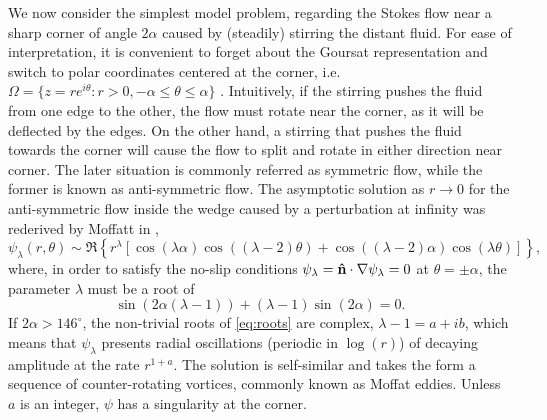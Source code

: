 We now consider the simplest model problem, regarding the Stokes flow near a sharp corner of angle $2\alpha$ caused by (steadily) stirring the distant fluid. For ease of interpretation, it is convenient to forget about the Goursat representation and switch to polar coordinates centered at the corner, i.e. $\Omega = \{z = re^{i\theta} : r > 0, -\alpha \leq \theta \leq \alpha \}$ . Intuitively, if the stirring pushes the fluid from one edge to the other, the flow must rotate near the corner, as it will be deflected by the edges. On the other hand, a stirring that pushes the fluid towards the corner will cause the flow to split and rotate in either direction near corner. The later situation is commonly referred as symmetric flow, while the former is known as anti-symmetric flow. The asymptotic solution as $r\to 0$ for the anti-symmetric flow inside the wedge caused by a perturbation at infinity was rederived by Moffatt in \cite{moffatt64},
\begin{equation}
\psi_\lambda(r,\theta) \sim \Re\left\{r^\lambda \left[\cos{(\lambda\alpha)}\cos{\left((\lambda-2)\theta\right)}+\cos{\left((\lambda-2)\alpha\right)}\cos{(\lambda\theta)}\right]\right\},
\end{equation}
where, in order to satisfy the no-slip conditions $\psi_\lambda=\mathbf{\hat{n}}\cdot\nabla\psi_\lambda=0$ at $\theta=\pm\alpha$, the parameter $\lambda$ must be a root of
\begin{equation}\label{eq:roots}
\sin{\left(2\alpha(\lambda-1)\right)} + (\lambda-1)\sin{(2\alpha)}=0.
\end{equation}
If $2\alpha>146^\circ$, the non-trivial roots of \eqref{eq:roots} are complex, $\lambda-1=a + ib$, which means that $\psi_\lambda$ presents radial oscillations (periodic in $\log(r)$) of decaying amplitude at the rate  $r^{1+a}$. The solution is self-similar and takes the form a sequence of counter-rotating vortices, commonly known as Moffat eddies. Unless $a$ is an integer, $\psi$ has a singularity at the corner.

